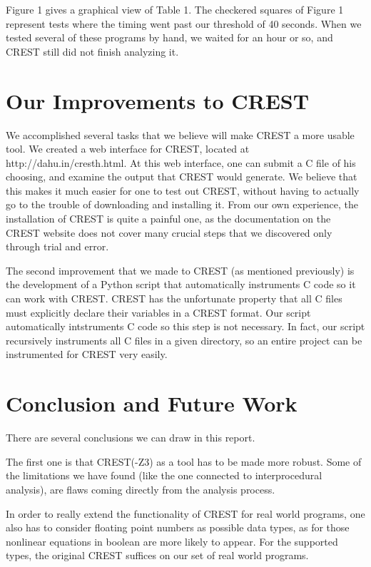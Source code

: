 \documentclass[oribibl]{llncs}
\begin{document}
Figure 1 gives a graphical view of Table 1. The checkered squares of Figure 1 represent tests where the timing went past our threshold of 40 seconds. When we tested several of these programs by hand, we waited for an hour or so, and CREST still did not finish analyzing it.

\section{Our Improvements to CREST}
\label{sctn:Improvements}
We accomplished several tasks that we believe will make CREST a more usable tool. We created a web interface for CREST, located at http://dahu.in/cresth.html. At this web interface, one can submit a C file of his choosing, and examine the output that CREST would generate. We believe that this makes it much easier for one to test out CREST, without having to actually go to the trouble of downloading and installing it. From our own experience, the installation of CREST is quite a painful one, as the documentation on the CREST website does not cover many crucial steps that we discovered only through trial and error.

The second improvement that we made to CREST (as mentioned previously) is the development of a Python script that automatically instruments C code so it can work with CREST. CREST has the unfortunate property that all C files must explicitly declare their variables in a CREST format. Our script automatically intstruments C code so this step is not necessary. In fact, our script recursively instruments all C files in a given directory, so an entire project can be instrumented for CREST very easily.


\section{Conclusion and Future Work}
\label{sctn:Conclusion}

There are several conclusions we can draw in this report.

The first one is that \textsc{CREST(-Z3)} as a tool has to be made more robust. Some of the limitations we have found (like the one connected to interprocedural analysis), are flaws coming directly from the analysis process.

In order to really extend the functionality of \textsc{CREST} for real world programs, one also has to consider floating point numbers as possible data types, as for those nonlinear equations in boolean are more likely to appear. For the supported types, the original \textsc{CREST} suffices on our set of real world programs.
\end{document}
